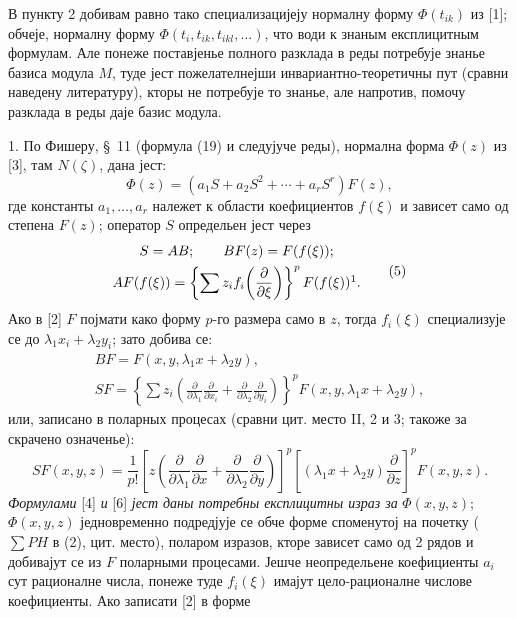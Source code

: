 \documentclass[11pt]{article}
\providecommand{\p}{\partial}
\begin{document}
В пункту 2 добивам равно тако специализацијеју нормалну форму \(\Phi(t_{ik})\) из [1]; обчеје, нормалну форму \(\Phi(t_i,t_{ik},t_{ikl},\ldots)\), что води к знаным експлицитным формулам. Але понеже поставјенье полного разклада в реды потребује знанье базиса модула \(M\), туде јест пожелателнејши инвариантно-теоретичны пут (сравни наведену литературу), кторы не потребује то знанье, але напротив, помочу разклада в реды даје базис модула.

1. По Фишеру, \S~11 (формула (19) и следујуче реды), нормална форма \(\Phi(z)\) из [3], там \(N(\zeta)\), дана јест:
\begin{equation}
        \Phi(z)=(a_1S+a_2S^2+\cdots+a_rS^r)F(z),
\tag{4}
\end{equation}
где константы \(a_1,\ldots,a_r\) належет к области коефициентов \(f(\xi)\) и зависет само од степена \(F(z)\); оператор \(S\) определьен јест через
\begin{equation}
\begin{gathered}
        S=AB;\qquad BF(z)=F(f(\xi));\\
        AF(f(\xi))=\left\{\sum z_i f_i\!\left(\frac{\p}{\p\xi}\right)\right\}^{p}F(f(\xi))\footnotemark.
\end{gathered}
\tag{5}
\end{equation}
Ако в [2] \(F\) појмати како форму \(p\)-го размера само в \(z\), тогда \(f_i(\xi)\) специализује се до \(\lambda_1x_i+\lambda_2y_i\); зато добива се:
\[
\begin{gathered}
        BF=F(x,y,\lambda_1x+\lambda_2y),\\
        SF=\left\{\sum z_i\left(\frac{\p}{\p\lambda_1}\frac{\p}{\p x_i}+
        \frac{\p}{\p\lambda_2}\frac{\p}{\p y_i}\right)\right\}^{p}
        F(x,y,\lambda_1x+\lambda_2y),
\end{gathered}
\]
или, записано в поларных процесах (сравни цит. место II, 2 и 3; такоже за скрачено означенье):
\begin{equation}
        SF(x,y,z)=\frac1{p!}\left[z\left(\frac{\p}{\p\lambda_1}\frac{\p}{\p x}+
        \frac{\p}{\p\lambda_2}\frac{\p}{\p y}\right)\right]^p
        \left[(\lambda_1x+\lambda_2y)\frac{\p}{\p z}\right]^p F(x,y,z).
\tag{6}
\end{equation}
{\itshape Формулами} [4] {\itshape и} [6] {\itshape јест даны потребны експлицитны израз за} \(\Phi(x,y,z)\); \(\Phi(x,y,z)\) једновременно подредјује се обче форме споменутој на почетку (\(\sum PH\) в (2), цит. место), поларом изразов, кторе зависет само од 2 рядов и добивајут се из \(F\) поларными процесами. Јешче неопредельене коефициенты \(a_i\) сут рационалне числа, понеже туде \(f_i(\xi)\) имајут цело-рационалне числове коефициенты. Ако записати [2] в форме
\end{document}
